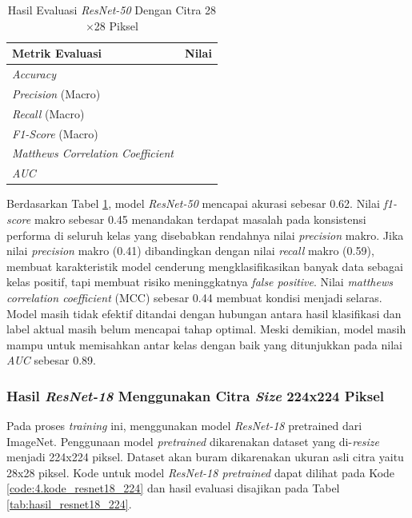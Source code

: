 \begin{table}[H]
    \centering
    \caption{Hasil Evaluasi \textit{ResNet-50} Dengan Citra 28$\times$28 Piksel}
    \label{tab:hasil_resnet50_28}
    \begin{tabular}{>{\raggedright\arraybackslash}m{} 
                    >{\centering\arraybackslash}m{}}
        \toprule
        \textbf{Metrik Evaluasi} & \textbf{Nilai} \\
        \midrule
        \textit{Accuracy} & 0.62 \\
        \textit{Precision} (Macro) & 0.41 \\
        \textit{Recall} (Macro) & 0.59 \\
        \textit{F1-Score} (Macro) & 0.45 \\
        \textit{Matthews Correlation Coefficient} & 0.44 \\
        \textit{AUC} & 0.89 \\
        \bottomrule
    \end{tabular}
\end{table}

Berdasarkan Tabel \ref{tab:hasil_resnet50_28}, model \textit{ResNet-50} 
mencapai akurasi sebesar 0.62. Nilai \textit{f1-score} makro sebesar 0.45 
menandakan terdapat masalah pada konsistensi performa di seluruh kelas yang 
disebabkan rendahnya nilai \textit{precision} makro. Jika nilai \textit{precision} 
makro (0.41) dibandingkan dengan nilai \textit{recall} makro (0.59), 
membuat karakteristik model cenderung mengklasifikasikan banyak data 
sebagai kelas positif, tapi membuat risiko meninggkatnya \textit{false 
positive}. Nilai \textit{matthews correlation coefficient} (MCC) sebesar 
0.44 membuat kondisi menjadi selaras. Model masih tidak efektif ditandai 
dengan hubungan antara hasil klasifikasi dan label aktual masih belum 
mencapai tahap optimal. Meski demikian, model masih mampu untuk memisahkan 
antar kelas dengan baik yang ditunjukkan pada nilai \textit{AUC} sebesar 
0.89. \par


\subsubsection{Hasil \textit{ResNet-18} Menggunakan Citra \textit{Size} 224x224 Piksel} \label{IV.Resnet18_224}
Pada proses \textit{training} ini, menggunakan model \textit{ResNet-18} 
pretrained dari ImageNet. Penggunaan model \textit{pretrained} dikarenakan 
dataset yang di-\textit{resize} menjadi 224x224 piksel. Dataset akan buram 
dikarenakan ukuran asli citra yaitu 28x28 piksel. Kode untuk model 
\textit{ResNet-18 pretrained} dapat dilihat pada Kode \ref{code:4.kode_resnet18_224} 
dan hasil evaluasi disajikan pada Tabel \ref{tab:hasil_resnet18_224}. \par

